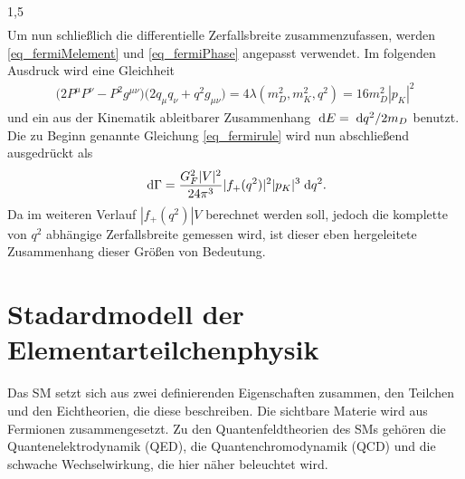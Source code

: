 \documentclass[11pt,a4paper,twoside]{report}
\begin{document}
\begin{spacing}{1,5}
\begin{align}
 \label{eq_fermiPhase}
\end{align}
Um nun schließlich die differentielle Zerfallsbreite zusammenzufassen, werden \eqref{eq_fermiMelement} und \eqref{eq_fermiPhase} angepasst verwendet. Im
folgenden Ausdruck wird eine Gleichheit
\begin{align}
 \big(2P^\mu P^\nu - P^2 g^{\mu\nu}\big)\big(2q_\mu q_\nu + q^2g_{\mu\nu}) = 4 \lambda(m_D^2,m_K^2,q^2) = 16 m_D^2 |p_K|^2
\end{align}
und ein aus der Kinematik ableitbarer Zusammenhang $\; \mathrm{d} E = \; \mathrm{d} q^2 / 2m_D$ benutzt. Die zu Beginn genannte Gleichung \eqref{eq_fermirule} wird 
nun abschließend ausgedrückt als
\begin{align}
 \; \mathrm{d} \Gamma = \frac{G_F^2|V|^2}{24\pi^3} |f_+(q^2)|^2 |p_K|^3 \; \mathrm{d} q^2.
\end{align}
Da im weiteren Verlauf $|f_+(q^2)|V$ berechnet werden soll, jedoch die komplette von $q^2$ abhängige Zerfallsbreite gemessen wird, ist dieser eben hergeleitete
Zusammenhang dieser Größen von Bedeutung.



\section{Stadardmodell der Elementarteilchenphysik}
Das SM setzt sich aus zwei definierenden Eigenschaften zusammen, den Teilchen und den Eichtheorien, die diese beschreiben. Die sichtbare Materie wird 
aus Fermionen zusammengesetzt. Zu den Quantenfeldtheorien des SMs gehören die Quantenelektrodynamik (QED), die Quantenchromodynamik (QCD) und die schwache
Wechselwirkung, die hier näher beleuchtet wird. 


\end{spacing}
\end{document}
